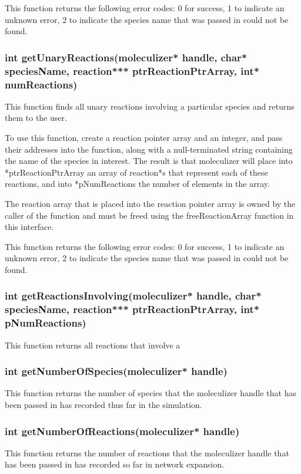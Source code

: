 This function returns the following error codes: 0 for success, 1 to
indicate an unknown error, 2 to indicate the species name that was
passed in could not be found.



\subsubsection{int getUnaryReactions(moleculizer* handle, char*
  speciesName, reaction*** ptrReactionPtrArray, int* numReactions)}

This function finds all unary reactions involving a particular
species and returns them to the user.

To use this function, create a reaction pointer array and an integer,
and pass their addresses into the function, along with a
null-terminated string containing the name of the species in
interest.  The result is that moleculizer will place into
*ptrReactionPtrArray an array of reaction*s that represent each of
these reactions, and into *pNumReactions the number of elements in the array.

The reaction array that is placed into the reaction pointer array is
owned by the caller of the function and must be freed using the
freeReactionArray function in this interface.

This function returns the following error codes: 0 for success, 1 to
indicate an unknown error, 2 to indicate the species name that was
passed in could not be found.

\subsubsection{int getReactionsInvolving(moleculizer* handle, char*
  speciesName, reaction*** ptrReactionPtrArray, int* pNumReactions)}

This function returns all reactions that involve a 


\subsubsection{int getNumberOfSpecies(moleculizer* handle)}
This function returns the number of species that the moleculizer
handle that has been passed in has recorded thus far in the
simulation.

\subsubsection{int getNumberOfReactions(moleculizer* handle)}
This function returns the number of reactions that the moleculizer
handle that has been passed in has recorded so far in network expansion.

